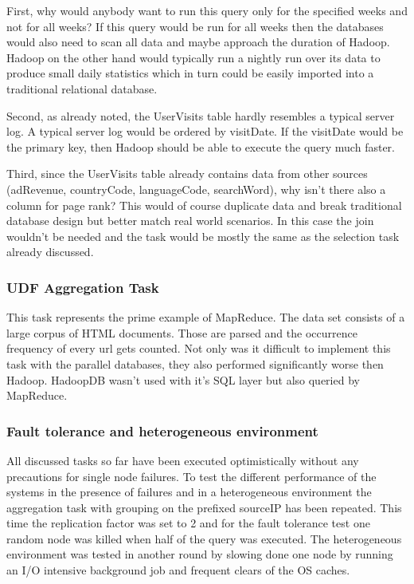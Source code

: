 \documentclass[12pt,a4paper]{scrartcl}		%
\begin{document}
First, why would anybody want to run this query only for the specified weeks and not for all weeks? If this query would be run for all weeks then the databases would also need to scan all data and maybe approach the duration of Hadoop. Hadoop on the other hand would typically run a nightly run over its data to produce small daily statistics which in turn could be easily imported into a traditional relational database.

Second, as already noted, the UserVisits table hardly resembles a typical server log. A typical server log would be ordered by visitDate. If the visitDate would be the primary key, then Hadoop should be able to execute the query much faster.

Third, since the UserVisits table already contains data from other sources (adRevenue, countryCode, languageCode, searchWord), why isn't there also a column for page rank? This would of course duplicate data and break traditional database design but better match real world scenarios. In this case the join wouldn't be needed and the task would be mostly the same as the selection task already discussed.

\subsubsection{UDF Aggregation Task}
This task represents the prime example of MapReduce. The data set consists of a large corpus of HTML documents. Those are parsed and the occurrence frequency of every url gets counted. Not only was it difficult to implement this task with the parallel databases, they also performed significantly worse then Hadoop. HadoopDB wasn't used with it's SQL layer but also queried by MapReduce. 

\subsubsection{Fault tolerance and heterogeneous environment}
All discussed tasks so far have been executed optimistically without any precautions for single node failures. To test the different performance of the systems in the presence of failures and in a heterogeneous environment the aggregation task with grouping on the prefixed sourceIP has been repeated. This time the replication factor was set to 2 and for the fault tolerance test one random node was killed when half of the query was executed. The heterogeneous environment was tested in another round by slowing done one node by running an I/O intensive background job and frequent clears of the OS caches.
\end{document}
